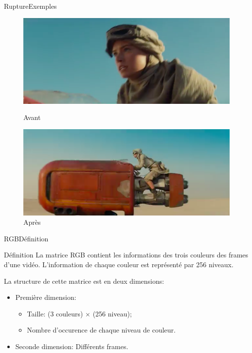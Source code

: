 \begin{frame}{Rupture}{Exemples}
\begin{figure}
   \begin{minipage}[c]{.46\linewidth}
	  \centering
      \includegraphics[scale=0.2]{images/rupture2-1.png}
      \caption{Avant}
   \end{minipage} \hfill
   \begin{minipage}[c]{.46\linewidth}
      \centering
      \includegraphics[scale=0.2]{images/rupture2-2.png}
      \caption{Après}
   \end{minipage}
\end{figure}

\end{frame}

\begin{frame}{RGB}{Définition}
\begin{block}{Définition}
La matrice RGB contient les informations des trois couleurs des frames d'une vidéo. L'information de chaque couleur est représenté par 256 niveaux.

La structure de cette matrice est en deux dimensions:

\begin{itemize}
	\item Première dimension: 
		\begin{itemize}
			\item Taille: (3 couleurs) $\times$ (256 niveau);
			\item Nombre d'occurence de chaque niveau de couleur.
		\end{itemize}
	\item Seconde dimension: Différents frames.
\end{itemize}

\end{block}

\end{frame}

